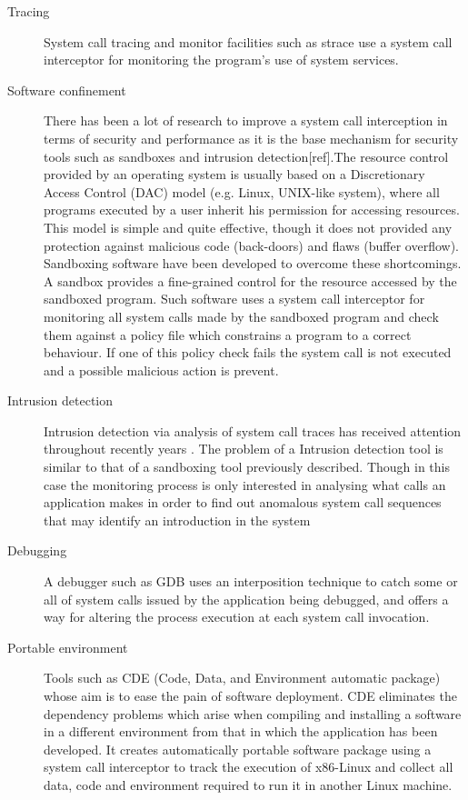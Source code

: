 \begin{description}

\item[Tracing]
System call tracing and monitor facilities such as strace \cite{strace} use a system call interceptor for monitoring the program's use of system services. 

\item[Software confinement]
There has been a lot of research to improve a system call interception in terms of security and performance as it is the base mechanism for security tools such as sandboxes and intrusion detection[ref].The resource control provided by an operating system is usually based on a Discretionary Access Control (DAC)  model (e.g. Linux, UNIX-like system), where all programs executed by a user inherit his permission for accessing resources. This model is simple and quite effective, though it does not provided any protection against malicious code (back-doors) and flaws (buffer overflow). Sandboxing software \cite{MapBox, Janus, Provos02improvinghost, sfi, Noordende_asecure} have been developed to overcome these shortcomings. A sandbox provides a fine-grained control for the resource accessed by the sandboxed program. Such software uses a system call interceptor for monitoring all system calls made by the sandboxed program and check them against a policy file which constrains a program to a correct behaviour. If one of this policy check fails the system call is not executed and a possible malicious action is prevent. 

\item[Intrusion detection]
Intrusion detection via analysis of system call traces has received attention throughout recently years \cite{introd_detection, Kosoresow97intrusiondetection}. The problem of a Intrusion detection tool  is similar to that of a sandboxing tool previously described. Though in this case the monitoring process is only interested in analysing what calls an application makes in order to find out anomalous system call sequences that may identify an introduction in the system  

\item[Debugging] 
A debugger  such as GDB uses an interposition technique to catch some or all of system calls issued by the application being debugged, and offers a way for altering the process execution at each system call invocation. 

\item[Portable environment]
Tools such as CDE  \cite{CDE} (Code, Data, and Environment automatic package) whose aim is to ease the pain of software deployment. CDE  eliminates the dependency problems which arise when compiling and installing a software in a different environment from that in which the application has been developed. It creates automatically portable software package using a system call interceptor to track the execution of x86-Linux and collect all data, code and environment required to run it in another Linux machine.   


\end{description}
